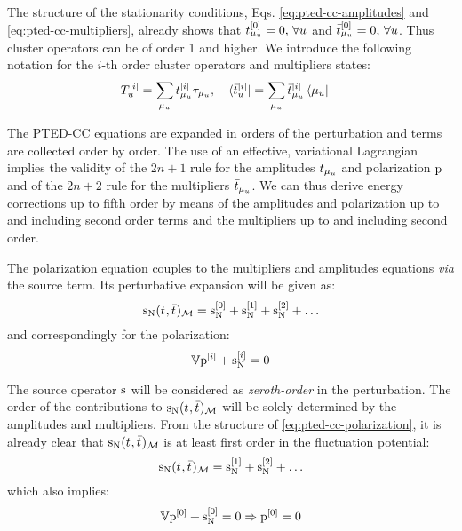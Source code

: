 The structure of the stationarity conditions,
Eqs. \eqref{eq:pted-cc-amplitudes} and \eqref{eq:pted-cc-multipliers},
already shows that $t_{\mu_u}^{[0]} = 0, \,\forall u$ and
$\bar{t}_{\mu_u}^{[0]} = 0, \, \forall u$.
Thus cluster operators can be of order 1 and higher. We introduce the
following notation for the $i$-th order cluster operators and
multipliers states:
\begin{alignat}{2}
  T_u^{[i]} = \sum_{\mu_u}t_{\mu_u}^{[i]}\tau_{\mu_u},
  \quad&
  \bra{\bar{t}_{u}^{[i]}} = \sum_{\mu_u}\bar{t}_{\mu_u}^{[i]}\bra{\mu_u}
\end{alignat}

The \acrshort{PTED}-\acrshort{CC} equations are expanded in orders of the
perturbation and terms are collected order by order. The use of an
effective, variational Lagrangian implies the validity of the $2n+1$
rule for the amplitudes $t_{\mu_u}$ and polarization $\mathrm{p}$ and of the
$2n+2$ rule for the multipliers $\bar{t}_{\mu_u}$.
We can thus derive energy corrections up to fifth order by means of the
amplitudes and polarization up to and including second order terms and
the multipliers up to and including second order.

The polarization equation couples to the multipliers and amplitudes
equations \emph{via} the source term.
Its perturbative expansion will be given as:
\begin{equation}\label{eq:source-term-pt}
  \mathrm{s}_{\mathrm{N}}(t_{},\bar{t}_{})_\mathcal{M} =
  \mathrm{s}_{\mathrm{N}}^{[0]}
  + \mathrm{s}_{\mathrm{N}}^{[1]}
  + \mathrm{s}_{\mathrm{N}}^{[2]}
  + \ldots
\end{equation}
and correspondingly for the polarization:
\begin{equation}\label{eq:pol-eq-pt}
  \mathbb{V}\mathrm{p}^{[i]} + \mathrm{s}_{\mathrm{N}}^{[i]} = 0
\end{equation}

The source operator $\mathrm{s}$ will be considered as \emph{zeroth-order} in
the perturbation.
The order of the contributions to
$\mathrm{s}_{\mathrm{N}}(t_{},\bar{t}_{})_\mathcal{M}$ will be solely determined
by the amplitudes and multipliers. From the structure of
\eqref{eq:pted-cc-polarization}, it is already clear that
$\mathrm{s}_{\mathrm{N}}(t_{},\bar{t}_{})_\mathcal{M}$ is at least first order
in the fluctuation potential:
\begin{equation}
  \mathrm{s}_{\mathrm{N}}(t_{},\bar{t}_{})_\mathcal{M} =
  \mathrm{s}_{\mathrm{N}}^{[1]}
  + \mathrm{s}_{\mathrm{N}}^{[2]}
  + \ldots
\end{equation}
which also implies:
\begin{equation}
  \mathbb{V}\mathrm{p}^{[0]} + \mathrm{s}_{\mathrm{N}}^{[0]} = 0 \Rightarrow  \mathrm{p}^{[0]} = 0
\end{equation}

